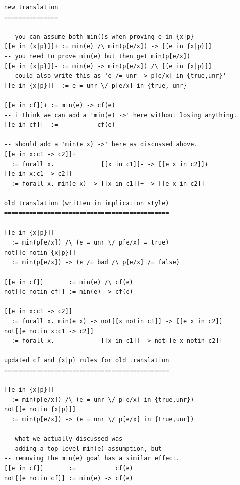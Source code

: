 \documentclass[preprint]{sigplanconf}
\begin{document}
\small
\begin{verbatim}
new translation
===============

-- you can assume both min()s when proving e in {x|p} 
[[e in {x|p}]]+ := min(e) /\ min(p[e/x]) -> [[e in {x|p}]]
-- you need to prove min(e) but then get min(p[e/x])
[[e in {x|p}]]- := min(e) -> min(p[e/x]) /\ [[e in {x|p}]]
-- could also write this as 'e /= unr -> p[e/x] in {true,unr}'
[[e in {x|p}]]  := e = unr \/ p[e/x] in {true, unr}

[[e in cf]]+ := min(e) -> cf(e)
-- i think we can add a 'min(e) ->' here without losing anything.
[[e in cf]]- :=           cf(e)

-- should add a 'min(e x) ->' here as discussed above.
[[e in x:c1 -> c2]]+
  := forall x.             [[x in c1]]- -> [[e x in c2]]+   
[[e in x:c1 -> c2]]-
  := forall x. min(e x) -> [[x in c1]]+ -> [[e x in c2]]-

old translation (written in implication style)
==============================================

[[e in {x|p}]]       
  := min(p[e/x]) /\ (e = unr \/ p[e/x] = true)
not[[e notin {x|p}]] 
  := min(p[e/x]) -> (e /= bad /\ p[e/x] /= false)

[[e in cf]]       := min(e) /\ cf(e)
not[[e notin cf]] := min(e) -> cf(e)

[[e in x:c1 -> c2]] 
  := forall x. min(e x) -> not[[x notin c1]] -> [[e x in c2]]
not[[e notin x:c1 -> c2]]
  := forall x.             [[x in c1]] -> not[[e x notin c2]]

updated cf and {x|p} rules for old translation
==============================================

[[e in {x|p}]]       
  := min(p[e/x]) /\ (e = unr \/ p[e/x] in {true,unr})
not[[e notin {x|p}]] 
  := min(p[e/x]) -> (e = unr \/ p[e/x] in {true,unr})

-- what we actually discussed was 
-- adding a top level min(e) assumption, but
-- removing the min(e) goal has a similar effect.
[[e in cf]]       :=           cf(e)
not[[e notin cf]] := min(e) -> cf(e)
\end{verbatim}
\end{document}
